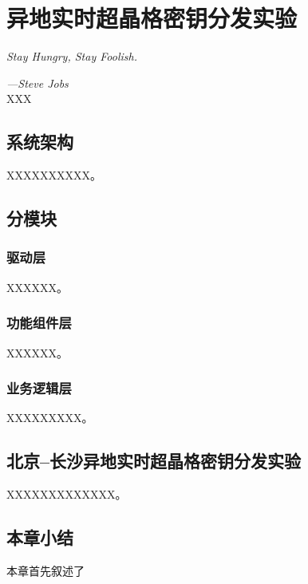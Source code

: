 \chapter{异地实时超晶格密钥分发实验}
\label{ch6}

\emph{\kaishu Stay Hungry, Stay Foolish.}

\emph{\kaishu \hfill ---Steve Jobs}\\

XXX


\section{系统架构}

XXXXXXXXXX。


\section{分模块}
\subsection{驱动层}

XXXXXX。

\subsection{功能组件层}

XXXXXX。


\subsection{业务逻辑层}

XXXXXXXXX。


\section{北京--长沙异地实时超晶格密钥分发实验}

XXXXXXXXXXXXX。




\section{本章小结}
本章首先叙述了

